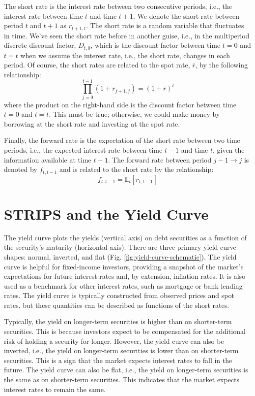 \documentclass[11pt]{article}
\theoremstyle{definition}
\begin{document}
The short rate is the interest rate between two consecutive periods, i.e., the interest rate between time $t$ and time $t+1$. We denote the short rate between period $t$ and $t+1$ as $r_{t+1,t}$. The short rate is a random variable that fluctuates in time. We've seen the short rate before in another guise, i.e., in the multiperiod discrete discount factor, $D_{t,0}$, which is the discount factor between time $t = 0$ and $t = t$ when we assume the 
interest rate, i.e., the short rate, changes in each period. Of course, the short rates are related to the spot rate, $\bar{r}$, by the following relationship:
\begin{equation}
\prod_{j=0}^{t-1}\left(1+r_{j+1,j}\right) = \left(1+\bar{r}\right)^{t}
\end{equation}
where the product on the right-hand side is the discount factor between time $t = 0$ and $t = t$.
This must be true; otherwise, we could make money by borrowing at the short rate and investing at the spot rate.

Finally, the forward rate is the expectation of the short rate between two time periods, i.e., the expected interest rate between time $t-1$ and time $t$, given the information available at time $t-1$. 
The forward rate between period $j-1\rightarrow{j}$ is denoted by $f_{t,t-1}$ and is related to the short rate by the relationship:
\begin{equation}
	f_{t,t-1} = \mathbb{E}_{t}\left[r_{t,t-1}\right]
\end{equation}

\section*{STRIPS and the Yield Curve}
The yield curve plots the yields (vertical axis) on debt securities as a function of the security's maturity (horizontal axis). 
There are three primary yield curve shapes: normal, inverted, and flat (Fig. \ref{fig:yield-curve-schematic}).
The yield curve is helpful for fixed-income investors, providing a snapshot of the market's expectations for future interest rates and, by extension, inflation rates. It is also used as a benchmark for other interest rates, such as mortgage or bank lending rates. The yield curve is typically constructed from observed prices and spot rates, but these quantities can be described as functions of the short rates. 

Typically, the yield on longer-term securities is higher than on shorter-term securities. This is because investors expect to be compensated for the additional risk of holding a security for longer. However, the yield curve can also be inverted, i.e., the yield on longer-term securities is lower than on shorter-term securities. This is a sign that the market expects interest rates to fall in the future. The yield curve can also be flat, i.e., the yield on longer-term securities is the same as on shorter-term securities. This indicates that the market expects interest rates to remain the same.
\end{document}
